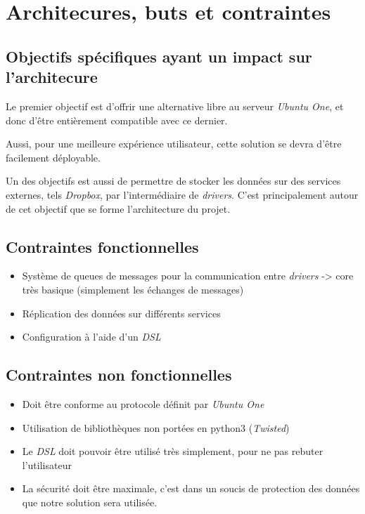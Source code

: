 \chapter{Architecures, buts et contraintes}
\thispagestyle{EIP}

\section{Objectifs spécifiques ayant un impact sur l'architecure}

Le premier objectif est d'offrir une alternative libre au serveur
\emph{Ubuntu One}, et donc d'être entièrement compatible avec ce
dernier.

Aussi, pour une meilleure expérience utilisateur, cette solution se
devra d'être facilement déployable.

Un des objectifs est aussi de permettre de stocker les données sur des
services externes, tels \emph{Dropbox}, par l'intermédiaire de
\emph{drivers}. C'est principalement autour de cet objectif que se forme
l'architecture du projet.

\section{Contraintes fonctionnelles}

\begin{itemize}
\itemsep1pt\parskip0pt
\item
  Système de queues de messages pour la communication entre
  \emph{drivers} -\textgreater{} core très basique (simplement les
  échanges de messages)
\item
  Réplication des données sur différents services
\item
  Configuration à l'aide d'un \emph{DSL}
\end{itemize}

\section{Contraintes non fonctionnelles}

\begin{itemize}
\itemsep1pt\parskip0pt
\item
  Doit être conforme au protocole définit par \emph{Ubuntu One}
\item
  Utilisation de bibliothèques non portées en python3 (\emph{Twisted})
\item
  Le \emph{DSL} doit pouvoir être utilisé très simplement, pour ne pas
  rebuter l'utilisateur
\item
  La sécurité doit être maximale, c'est dans un soucis de protection des
  données que notre solution sera utilisée.
\end{itemize}